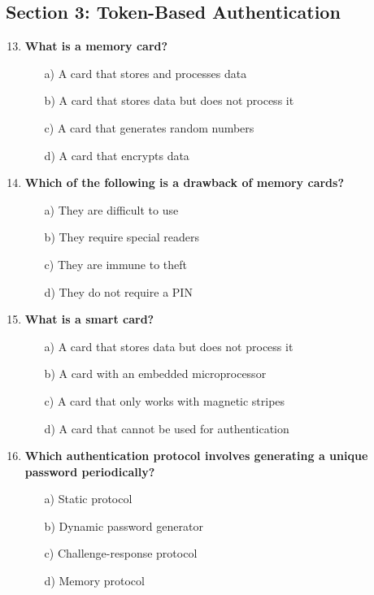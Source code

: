 \documentclass{article}
\begin{document}
\subsection*{Section 3: Token-Based Authentication}
\begin{enumerate}
    \setcounter{enumi}{12}
    \item \textbf{What is a memory card?}
    \begin{itemize}
        \item[a)] A card that stores and processes data  
        \item[b)] A card that stores data but does not process it  
        \item[c)] A card that generates random numbers  
        \item[d)] A card that encrypts data  
    \end{itemize}

    \item \textbf{Which of the following is a drawback of memory cards?}
    \begin{itemize}
        \item[a)] They are difficult to use  
        \item[b)] They require special readers  
        \item[c)] They are immune to theft  
        \item[d)] They do not require a PIN  
    \end{itemize}

    \item \textbf{What is a smart card?}
    \begin{itemize}
        \item[a)] A card that stores data but does not process it  
        \item[b)] A card with an embedded microprocessor  
        \item[c)] A card that only works with magnetic stripes  
        \item[d)] A card that cannot be used for authentication  
    \end{itemize}

    \item \textbf{Which authentication protocol involves generating a unique password periodically?}
    \begin{itemize}
        \item[a)] Static protocol  
        \item[b)] Dynamic password generator  
        \item[c)] Challenge-response protocol  
        \item[d)] Memory protocol  
    \end{itemize}


\end{enumerate}
\end{document}
